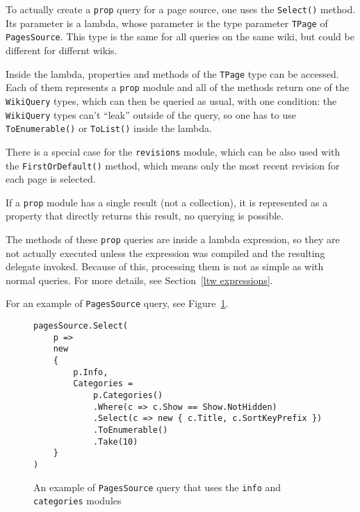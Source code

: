 \medskip

To actually create a \texttt{prop} query for a page source, one uses the \lstinline{Select()} method.
Its parameter is a lambda, whose parameter is the type parameter \lstinline{TPage} of \lstinline{PagesSource}.
This type is the same for all queries on the same wiki, but could be different for differnt wikis.

Inside the lambda, properties and methods of the \lstinline{TPage} type can be accessed.
Each of them represents a \texttt{prop} module and all of the methods return one of the \lstinline{WikiQuery} types,
which can then be queried as usual, with one condition:
the \lstinline{WikiQuery} types can't ``leak'' outside of the query, so one has to use \lstinline{ToEnumerable()} or \lstinline{ToList()} inside the lambda.

There is a special case for the \texttt{revisions} module,
which can be also used with the \lstinline{FirstOrDefault()} method,
which means only the most recent revision for each page is selected.

If a \texttt{prop} module has a single result (not a collection), it is represented as a property
that directly returns this result, no querying is possible.

\medskip

The methods of these \texttt{prop} queries are inside a lambda expression,
so they are not actually executed unless the expression was compiled and the resulting delegate invoked.
Because of this, processing them is not as simple as with normal queries.
For more details, see Section~\ref{ltw expressions}.

\medskip

For an example of \lstinline{PagesSource} query, see Figure~\ref{PS query}.

\begin{figure}[htbp]

\begin{lstlisting}
pagesSource.Select(
    p =>
    new
    {
        p.Info,
        Categories =
            p.Categories()
            .Where(c => c.Show == Show.NotHidden)
            .Select(c => new { c.Title, c.SortKeyPrefix })
            .ToEnumerable()
            .Take(10)
	}
)
\end{lstlisting}

\caption{An example of  \lstinline{PagesSource} query that uses the \texttt{info} and \texttt{categories} modules}
\label{PS query}

\end{figure}

